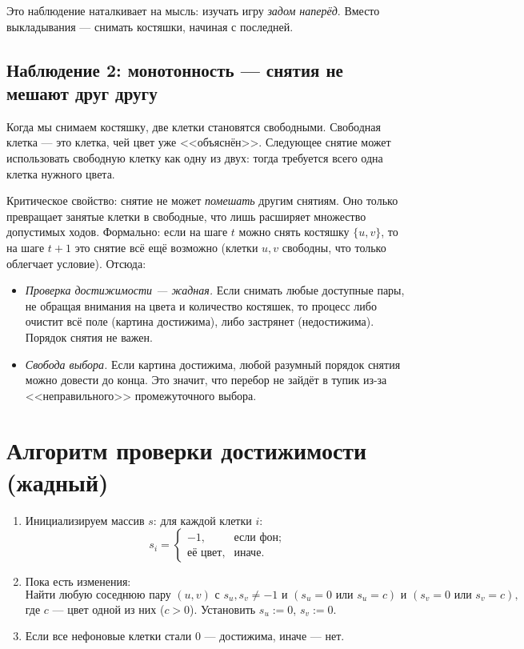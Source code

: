 \documentclass[12pt,a4paper]{article}
\begin{document}
Это наблюдение наталкивает на мысль: изучать игру \emph{задом наперёд}.
Вместо выкладывания --- снимать костяшки, начиная с последней.

\subsection{Наблюдение 2: монотонность --- снятия не мешают друг другу}

Когда мы снимаем костяшку, две клетки становятся свободными. Свободная
клетка --- это клетка, чей цвет уже <<объяснён>>. Следующее снятие может
использовать свободную клетку как одну из двух: тогда требуется всего
одна клетка нужного цвета.

Критическое свойство: снятие не может \emph{помешать} другим снятиям.
Оно только превращает занятые клетки в свободные, что лишь расширяет
множество допустимых ходов. Формально: если на шаге $t$ можно снять
костяшку $\{u,v\}$, то на шаге $t+1$ это снятие всё ещё возможно
(клетки $u,v$ свободны, что только облегчает условие). Отсюда:
\begin{itemize}
  \item \emph{Проверка достижимости --- жадная.} Если снимать любые
        доступные пары, не обращая внимания на цвета и количество
        костяшек, то процесс либо очистит всё поле (картина достижима),
        либо застрянет (недостижима). Порядок снятия не важен.
  \item \emph{Свобода выбора.} Если картина достижима, любой разумный
        порядок снятия можно довести до конца. Это значит, что перебор
        не зайдёт в тупик из-за <<неправильного>> промежуточного выбора.
\end{itemize}

\section{Алгоритм проверки достижимости (жадный)}

\begin{enumerate}
  \item Инициализируем массив $s$: для каждой клетки $i$:
        \[
          s_i = \begin{cases}
            -1, & \text{если фон};\\
            \text{её цвет}, & \text{иначе}.
          \end{cases}
        \]
  \item Пока есть изменения:
        \[
          \text{Найти любую соседнюю пару } (u,v) \text{ с } s_u,s_v\ne-1
          \text{ и } (s_u=0 \text{ или } s_u=c) \text{ и } (s_v=0 \text{ или } s_v=c),
        \]
        где $c$ --- цвет одной из них ($c>0$). Установить $s_u:=0$, $s_v:=0$.
  \item Если все нефоновые клетки стали $0$ --- достижима, иначе --- нет.
\end{enumerate}
\end{document}
